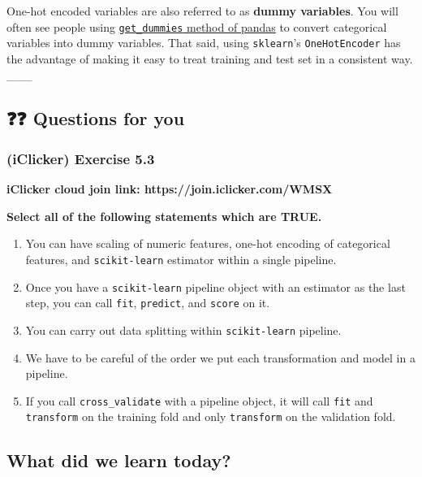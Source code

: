 \documentclass[11pt]{article}
\providecommand{\tightlist}{%
      \setlength{\itemsep}{0pt}\setlength{\parskip}{0pt}}
\begin{document}
One-hot encoded variables are also referred to as \textbf{dummy
variables}. You will often see people using
\href{https://pandas.pydata.org/docs/reference/api/pandas.get_dummies.html}{\texttt{get\_dummies}
method of pandas} to convert categorical variables into dummy variables.
That said, using \texttt{sklearn}'s \texttt{OneHotEncoder} has the
advantage of making it easy to treat training and test set in a
consistent way.\\
\_\_\_

    \subsection{❓❓ Questions for you}\label{questions-for-you}

    \subsubsection{(iClicker) Exercise 5.3}\label{iclicker-exercise-5.3}

\textbf{iClicker cloud join link: https://join.iclicker.com/WMSX}

\textbf{Select all of the following statements which are TRUE.}

\begin{enumerate}
\def\labelenumi{\arabic{enumi}.}
\tightlist
\item
  You can have scaling of numeric features, one-hot encoding of
  categorical features, and \texttt{scikit-learn} estimator within a
  single pipeline.\\
\item
  Once you have a \texttt{scikit-learn} pipeline object with an
  estimator as the last step, you can call \texttt{fit},
  \texttt{predict}, and \texttt{score} on it.
\item
  You can carry out data splitting within \texttt{scikit-learn}
  pipeline.
\item
  We have to be careful of the order we put each transformation and
  model in a pipeline.
\item
  If you call \texttt{cross\_validate} with a pipeline object, it will
  call \texttt{fit} and \texttt{transform} on the training fold and only
  \texttt{transform} on the validation fold.
\end{enumerate}

    \subsection{What did we learn today?}\label{what-did-we-learn-today}
\end{document}
